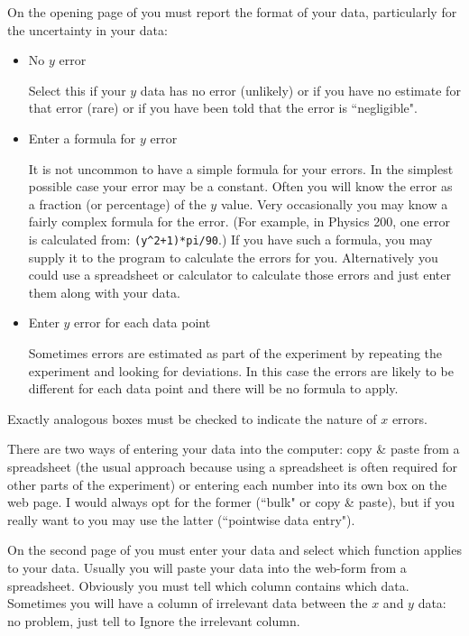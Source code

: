 On the opening page of \WAPP you must report the format of your
data, particularly for the uncertainty in your data:

\begin{itemize}
\item No $y$ error

Select this if your $y$ data has no error (unlikely) or if you
have no estimate for that error (rare) or if you have been told that
the error is ``negligible".

\item Enter a formula for $y$ error

It is not uncommon to have a simple formula for your errors.  In the simplest possible
case your error may be a constant.  Often you will know the error as a fraction (or percentage)
of the $y$ value.  Very occasionally you may know a fairly complex formula for the error. (For example,
in Physics 200, one error is calculated from: {\verb|(y^2+1)*pi/90|}.)  If you have such
a formula, you may supply it to the program to calculate the errors for you.
Alternatively you could use a spreadsheet or calculator to calculate those errors
and just enter them along  with your data.

\item Enter $y$ error for each data point

Sometimes errors are estimated as part of the experiment by repeating the experiment
and looking for deviations.  In this case the errors are likely to be different for
each data point and there will be no formula to apply.
\end{itemize}

Exactly analogous boxes must be checked to indicate the nature of $x$ errors.

There are two ways of entering your data into the computer: copy \& paste from
a spreadsheet (the usual approach because using a spreadsheet is often required
for other  parts of the experiment) or entering each number into its own box on the web page.
I would always opt for the former (``bulk" or copy \& paste), but if you really want
to you may use the latter (``pointwise data entry").

On the second page of \WAPP you must enter your data and select 
which function applies to your data.  Usually you will paste your data
into the web-form from a spreadsheet.  Obviously you must tell \WAPP
which column contains which data.  Sometimes you will have a column of irrelevant 
data between the $x$ and $y$ data: no problem, just tell \WAPP
to Ignore the irrelevant column.

